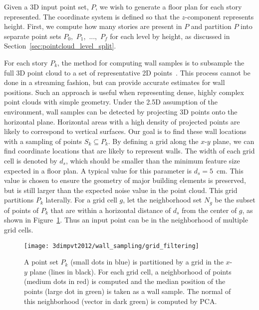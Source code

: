 \documentclass[12pt,onecolumn,oneside]{book}
\begin{document}
Given a 3D input point set, $P$, we wish to generate a floor plan for each story represented.  The coordinate system is defined so that the $z$-component represents height.  First, we compute how many stories are present in $P$ and partition $P$ into separate point sets $P_0$,~$P_1$,~...,~$P_f$ for each level by height, as discussed in Section~\ref{sec:pointcloud_level_split}.

For each story $P_k$, the method for computing wall samples is to subsample the full 3D point cloud to a set of representative 2D points~\cite{Turner12,Turner14,Turner14Journal,Okorn09}.  This process cannot be done in a streaming fashion, but can provide accurate estimates for wall positions.  Such an approach is useful when representing dense, highly complex point clouds with simple geometry.  Under the 2.5D assumption of the environment, wall samples can be detected by projecting 3D points onto the horizontal plane.  Horizontal areas with a high density of projected points are likely to correspond to vertical surfaces.  Our goal is to find these wall locations with a sampling of points $S_k \subseteq P_k$.  By defining a grid along the $x$-$y$ plane, we can find coordinate locations that are likely to represent walls.  The width of each grid cell is denoted by $d_s$, which should be smaller than the minimum feature size expected in a floor plan.  A typical value for this parameter is $d_s = 5$~cm.  This value is chosen to ensure the geometry of major building elements is preserved, but is still larger than the expected noise value in the point cloud.  This grid partitions $P_k$ laterally.  For a grid cell $g$, let the neighborhood set $N_g$ be the subset of points of $P_k$ that are within a horizontal distance of $d_s$ from the center of $g$, as shown in Figure~\ref{fig:grid_filtering}.  Thus an input point can be in the neighborhood of multiple grid cells.

\begin{figure}[t]

\begin{minipage}{1.0\linewidth}
  \centering
  \centerline{\texttt{[image: 3dimpvt2012/wall\_sampling/grid\_filtering]}}
\end{minipage}

\caption[Generating wall samples from 3D point clouds.]{A point set $P_k$ (small dots in blue) is partitioned by a grid in the $x$-$y$ plane (lines in black).  For each grid cell, a neighborhood of points (medium dots in red) is computed and the median position of the points (large dot in green) is taken as a wall sample.  The normal of this neighborhood (vector in dark green) is computed by PCA.}
\label{fig:grid_filtering}

\end{figure}
\end{document}
